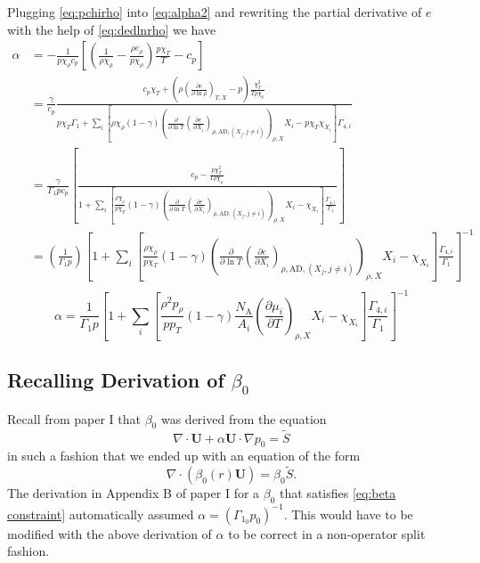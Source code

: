 Plugging \eqref{eq:pchirho} into \eqref{eq:alpha2} and rewriting the 
partial derivative of $e$ with the help of \eqref{eq:dedlnrho} we have
\begin{align*}
\alpha &= -\frac{1}{p\chi_\rho c_p}\left[\left(\frac{1}{\rho\chi_\rho}
  - \frac{\rho e_\rho}{p\chi_\rho}\right)\frac{p\chi_T}{T} - c_p\right] \\
&=\frac{\gamma}{c_p}\frac{c_p\chi_T + \left(\rho
  \left(\frac{\partial e}{\partial\ln\rho}\right)_{T,X}-p\right)
  \frac{\chi_T^2}{T\rho\chi_\rho}}
{p\chi_T\Gamma_1 + 
    \sum_i \left[\rho\chi_\rho\left(1-\gamma\right)\left(
      \frac{\partial}{\partial \ln T}\left(\frac{\partial e}{\partial X_i}
      \right)_{\rho,\text{AD},(X_j,j\neq i)}\right)_{\rho,X}X_i - p\chi_T
      \chi_{X_i}\right]\Gamma_{4,i}}\\
&=\frac{\gamma}{\Gamma_1 p c_p}\left[\frac{c_p - \frac{p\chi_T^2}
    {T\rho\chi_\rho}}
  {1 + \sum_i \left[\frac{\rho\chi_\rho}{p\chi_T}
      \left(1-\gamma\right)\left(
      \frac{\partial}{\partial \ln T}\left(\frac{\partial e}{\partial X_i}
      \right)_{\rho,\text{AD},(X_j,j\neq i)}\right)_{\rho,X}X_i - 
      \chi_{X_i}\right]\frac{\Gamma_{4,i}}{\Gamma_1}}\right]\\
&=\left(\frac{1}{\Gamma_1p}\right)
\left[1 + \sum_i \left[\frac{\rho\chi_\rho}{p\chi_T}
    \left(1-\gamma\right)\left(
    \frac{\partial}{\partial \ln T}\left(\frac{\partial e}{\partial X_i}
    \right)_{\rho,\text{AD},(X_j,j\neq i)}\right)_{\rho,X}X_i - 
    \chi_{X_i}\right]\frac{\Gamma_{4,i}}{\Gamma_1}\right]^{-1}\\
\end{align*}
\[\boxed{
  \alpha = \frac{1}{\Gamma_1p}\left[1 + \sum_i\left[\frac{\rho^2p_\rho}
      {pp_T}(1-\gamma)\frac{N_\text{A}}{A_i}
      \left(\frac{\partial\mu_i}{\partial T}\right)_{\rho,X}X_i - 
      \chi_{X_i}\right]\frac{\Gamma_{4,i}}{\Gamma_1}\right]^{-1}
}
\]

\subsection{Recalling Derivation of $\beta_0$}
\label{Recalling Derivation of beta0}
Recall from paper I that $\beta_0$ was derived from the equation 
\begin{equation}
\nabla\cdot\mathbf{U} + \alpha\mathbf{U}\cdot\nabla p_0 = \tilde{S}
\end{equation}
in such a fashion that we ended up with an equation of the form
\begin{equation}\label{eq:beta constraint}
\nabla\cdot\left(\beta_0(r)\mathbf{U}\right) = \beta_0\tilde{S}.
\end{equation}
The derivation in Appendix B of paper I for a $\beta_0$ that
satisfies \eqref{eq:beta constraint} automatically assumed $\alpha
= \left(\Gamma_{1_0}p_0\right)^{-1}$.  This would have to be modified
with the above derivation of $\alpha$ to be correct in a non-operator
split fashion.
